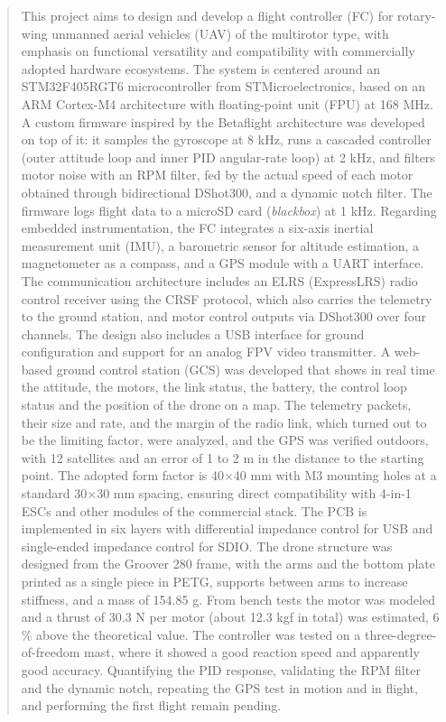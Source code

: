 \documentclass[12pt, letterpaper]{report}
\begin{document}
\begin{abstract}
\end{abstract}

\renewcommand{\abstractname}{Abstract}
\begin{abstract}
    \noindent This project aims to design and develop a flight controller (FC) for rotary-wing unmanned aerial vehicles (UAV) of the multirotor type, with emphasis on functional versatility and compatibility with commercially adopted hardware ecosystems.
The system is centered around an STM32F405RGT6 microcontroller from STMicroelectronics, based on an ARM Cortex-M4 architecture with floating-point unit (FPU) at 168 MHz. A custom firmware inspired by the Betaflight architecture was developed on top of it: it samples the gyroscope at 8 kHz, runs a cascaded controller (outer attitude loop and inner PID angular-rate loop) at 2 kHz, and filters motor noise with an RPM filter, fed by the actual speed of each motor obtained through bidirectional DShot300, and a dynamic notch filter. The firmware logs flight data to a microSD card (\textit{blackbox}) at 1 kHz.
Regarding embedded instrumentation, the FC integrates a six-axis inertial measurement unit (IMU), a barometric sensor for altitude estimation, a magnetometer as a compass, and a GPS module with a UART interface. The communication architecture includes an ELRS (ExpressLRS) radio control receiver using the CRSF protocol, which also carries the telemetry to the ground station, and motor control outputs via DShot300 over four channels. The design also includes a USB interface for ground configuration and support for an analog FPV video transmitter. A web-based ground control station (GCS) was developed that shows in real time the attitude, the motors, the link status, the battery, the control loop status and the position of the drone on a map. The telemetry packets, their size and rate, and the margin of the radio link, which turned out to be the limiting factor, were analyzed, and the GPS was verified outdoors, with 12 satellites and an error of 1 to 2 m in the distance to the starting point.
The adopted form factor is 40×40 mm with M3 mounting holes at a standard 30×30 mm spacing, ensuring direct compatibility with 4-in-1 ESCs and other modules of the commercial stack. The PCB is implemented in six layers with differential impedance control for USB and single-ended impedance control for SDIO. The drone structure was designed from the Groover 280 frame, with the arms and the bottom plate printed as a single piece in PETG, supports between arms to increase stiffness, and a mass of 154.85 g. From bench tests the motor was modeled and a thrust of 30.3 N per motor (about 12.3 kgf in total) was estimated, 6 \% above the theoretical value. The controller was tested on a three-degree-of-freedom mast, where it showed a good reaction speed and apparently good accuracy. Quantifying the PID response, validating the RPM filter and the dynamic notch, repeating the GPS test in motion and in flight, and performing the first flight remain pending.
\end{abstract}
\end{document}
